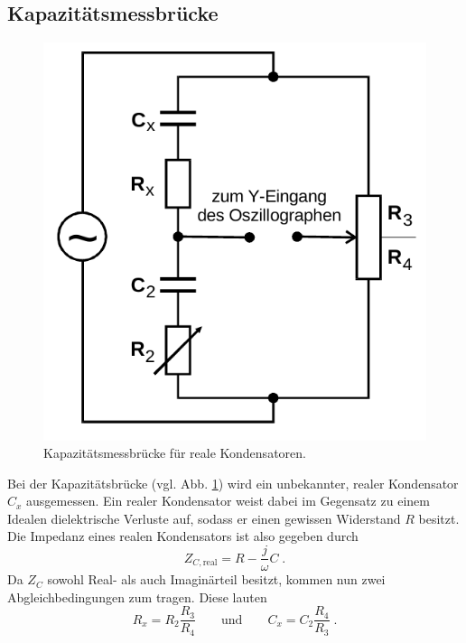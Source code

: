 \subsection{Kapazitätsmessbrücke}
\label{sec:Cbrücke}
\begin{figure}[H]
    \centering
    \includegraphics[scale=0.4]{pictures/3-C.png}
    \caption{Kapazitätsmessbrücke für reale Kondensatoren. \cite{AP01}}
    \label{fig:Cbrücke}
\end{figure}
\noindent
Bei der Kapazitätsbrücke (vgl. Abb. \ref{fig:Cbrücke}) wird ein unbekannter, realer Kondensator $C_x$ ausgemessen. Ein realer Kondensator
weist dabei im Gegensatz zu einem Idealen dielektrische Verluste auf, sodass er einen gewissen Widerstand $R$ besitzt. Die Impedanz
eines realen Kondensators ist also gegeben durch
\begin{equation}
    Z_{C,\text{real}}=R-\frac{j}{\omega}C \;.
\end{equation}
Da $Z_C$ sowohl Real- als auch Imaginärteil besitzt, kommen nun zwei Abgleichbedingungen zum tragen. Diese lauten
\begin{equation}
    R_x=R_2\frac{R_3}{R_4}
    \qquad\text{und}\qquad
    C_x=C_2\frac{R_4}{R_3} \;.
    \label{eqn:Cbrücke}
\end{equation}

